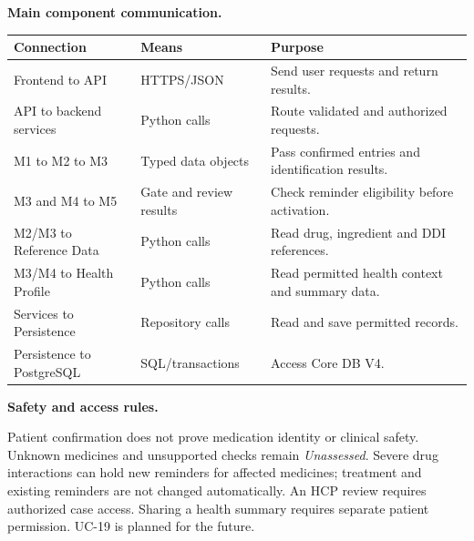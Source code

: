 \documentclass[10pt,letterpaper]{article}
\renewcommand{\arraystretch}{1.23}
\begin{document}
\noindent\textbf{Main component communication.}\par\smallskip
\begingroup\small\renewcommand{\arraystretch}{1.08}
\begin{tabularx}{\textwidth}{|L{0.34\textwidth}|L{0.23\textwidth}|Y|}
\hline
\textbf{Connection} & \textbf{Means} & \textbf{Purpose} \\ \hline
Frontend to API & HTTPS/JSON & Send user requests and return results. \\ \hline
API to backend services & Python calls & Route validated and authorized requests. \\ \hline
M1 to M2 to M3 & Typed data objects & Pass confirmed entries and identification results. \\ \hline
M3 and M4 to M5 & Gate and review results & Check reminder eligibility before activation. \\ \hline
M2/M3 to Reference Data & Python calls & Read drug, ingredient and DDI references. \\ \hline
M3/M4 to Health Profile & Python calls & Read permitted health context and summary data. \\ \hline
Services to Persistence & Repository calls & Read and save permitted records. \\ \hline
Persistence to PostgreSQL & SQL/transactions & Access Core DB V4. \\ \hline
\end{tabularx}
\endgroup

\noindent\textbf{Safety and access rules.}\par\smallskip
Patient confirmation does not prove medication identity or clinical safety.
Unknown medicines and unsupported checks remain \emph{Unassessed}.
Severe drug interactions can hold new reminders for affected medicines;
treatment and existing reminders are not changed automatically.
An HCP review requires authorized case access. Sharing a health summary
requires separate patient permission. UC-19 is planned for the future.

\makeatletter
\providecommand{\LogicalResetPageColumns}{%
  \global\@colht\textheight
  \global\@colroom\textheight
  \global\vsize\textheight
}
\makeatother
\end{document}
